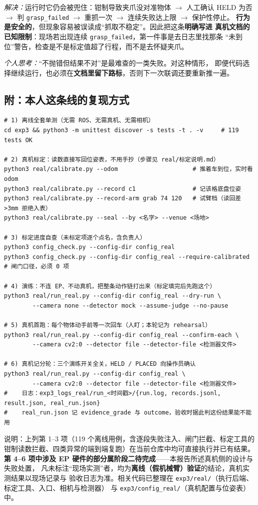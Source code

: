 \documentclass[12pt,a4paper]{ctexart}
\begin{document}
\textit{解决：}运行时它仍会被兜住：钳制导致夹爪没对准物体 $\to$ 人工确认 HELD 为否 $\to$
判 \texttt{grasp\_failed} $\to$ 重抓一次 $\to$ 连续失败达上限 $\to$ 保护性停止。
\textbf{行为是安全的}，但现象容易被误读成“抓取不稳定”。因此把这条\textbf{明确写进
真机文档的已知限制}：现场若出现连续 \texttt{grasp\_failed}，第一件事是去日志里找那条
“未到位”警告，检查是不是标定值超了行程，而不是去怀疑夹爪。

\textit{个人思考：}“不抛错但结果不对”是最难查的一类失败。对这种情形，
即便代码选择继续运行，也必须在\textbf{文档里留下路标}，否则下一次联调还要重新推一遍。

\subsection*{附：本人这条线的复现方式}

\begin{lstlisting}[numbers=none]
# 1) 离线全套单测（无需 ROS、无需真机、无需相机）
cd exp3 && python3 -m unittest discover -s tests -t . -v     # 119 tests OK

# 2) 真机标定：读数直接写回位姿表，不用手抄（步骤见 real/标定说明.md）
python3 real/calibrate.py --odom                     # 推着车到位，实时看 odom
python3 real/calibrate.py --record c1                # 记该格底盘位姿
python3 real/calibrate.py --record-arm grab 74 120   # 试臂档（读回差 >3mm 拒绝入表）
python3 real/calibrate.py --seal --by <名字> --venue <场地>

# 3) 标定进度自查（未标定项逐个点名，含负责人）
python3 config_check.py --config-dir config_real
python3 config_check.py --config-dir config_real --require-calibrated   # 闸门口径，必须 0 项

# 4) 演练：不连 EP、不动真机，把整条动作链打出来（标定填完后先跑这个）
python3 real/run_real.py --config-dir config_real --dry-run \
        --camera none --detector mock --assume-judge --no-pause

# 5) 真机首跑：每个物体动手前等一次回车（人盯；本轮记为 rehearsal）
python3 real/run_real.py --config-dir config_real --confirm-each \
        --camera cv2:0 --detector file --detector-file <检测器文件>

# 6) 真机记分轮：三个演练开关全关，HELD / PLACED 向操作员确认
python3 real/run_real.py --config-dir config_real \
        --camera cv2:0 --detector file --detector-file <检测器文件>
#    日志：exp3_logs_real/run_<时间戳>/{run.log, records.jsonl, result.json, real_run.json}
#    real_run.json 记 evidence_grade 与 outcome，验收时据此判这份结果能不能用
\end{lstlisting}

\vspace{2mm}
{\small 说明：上列第 1--3 项（119 个离线用例，含逐段失败注入、闸门拦截、标定工具的
钳制读数拦截、四类异常的端到端复跑）在当前仓库中均可直接执行并已有结果。
\textbf{第 4--6 项中涉及 EP 硬件的部分属阶段二待完成}——本报告所述真机侧的设计与失败处置，
凡未标注“现场实测”者，均为\textbf{离线（假机械臂）验证}的结论，真机实测结果以现场记录与
验收日志为准。相关代码已整理在 \texttt{exp3/real/}（执行后端、标定工具、入口、相机与检测器）
与 \texttt{exp3/config\_real/}（真机配置与位姿表）中。}
\end{document}
